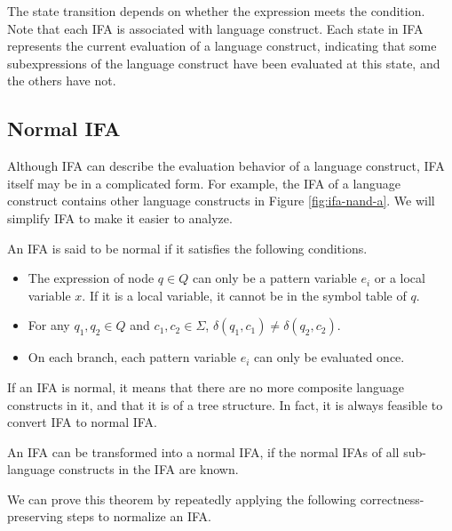 The state transition depends on whether the expression meets the condition. Note that each IFA is associated with language construct. Each state in IFA represents the current evaluation of a language construct, indicating that some subexpressions of the language construct have been evaluated at this state, and the others have not.

\subsection{Normal IFA}

Although IFA can describe the evaluation behavior of a language construct, IFA itself may be in a complicated form. For example, the IFA of a language construct contains other language constructs in Figure \ref{fig:ifa-nand-a}. We will simplify IFA to make it easier to analyze.

\begin{Def}
    \label{def:nmlifa}
    An IFA is said to be normal if it satisfies the following conditions.
    \begin{itemize}
        \item The expression of node $q \in Q$ can only be a pattern variable $e_i$ or a local variable $x$. If it is a local variable, it cannot be in the symbol table of $q$.
        \item For any $q_1,q_2 \in Q$ and $c_1, c_2 \in \Sigma$, $\delta(q_1, c_1) \neq \delta(q_2, c_2)$.
        \item On each branch, each pattern variable $e_i$ can only be evaluated once.
    \end{itemize}
\end{Def}

If an IFA is normal, it means that there are no more composite language constructs in it, and that it is of a tree structure.
In fact, it is always feasible to convert IFA to normal IFA.

\begin{mythm}
    \label{mythm:nmlifa}
    An IFA can be transformed into a normal IFA, if the normal IFAs of all sub-language constructs in the IFA are known.
\end{mythm}

We can prove this theorem by repeatedly applying the following correctness-preserving steps to normalize an IFA.

